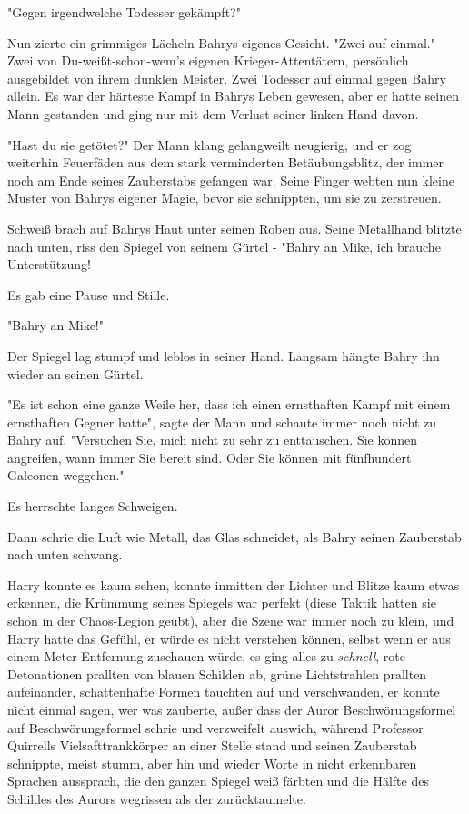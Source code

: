 {"Gegen irgendwelche Todesser gekämpft?"

Nun zierte ein grimmiges Lächeln Bahrys eigenes Gesicht. "Zwei auf einmal." Zwei von Du-weißt-schon-wem's eigenen Krieger-Attentätern, persönlich ausgebildet von ihrem dunklen Meister. Zwei Todesser auf einmal gegen Bahry allein. Es war der härteste Kampf in Bahrys Leben gewesen, aber er hatte seinen Mann gestanden und ging nur mit dem Verlust seiner linken Hand davon.

"Hast du sie getötet?" Der Mann klang gelangweilt neugierig, und er zog weiterhin Feuerfäden aus dem stark verminderten Betäubungsblitz, der immer noch am Ende seines Zauberstabs gefangen war. Seine Finger webten nun kleine Muster von Bahrys eigener Magie, bevor sie schnippten, um sie zu zerstreuen.

Schweiß brach auf Bahrys Haut unter seinen Roben aus. Seine Metallhand blitzte nach unten, riss den Spiegel von seinem Gürtel - "Bahry an Mike, ich brauche Unterstützung!

Es gab eine Pause und Stille.

"Bahry an Mike!"

Der Spiegel lag stumpf und leblos in seiner Hand. Langsam hängte Bahry ihn wieder an seinen Gürtel.

"Es ist schon eine ganze Weile her, dass ich einen ernsthaften Kampf mit einem ernsthaften Gegner hatte", sagte der Mann und schaute immer noch nicht zu Bahry auf. "Versuchen Sie, mich nicht zu sehr zu enttäuschen. Sie können angreifen, wann immer Sie bereit sind. Oder Sie können mit fünfhundert Galeonen weggehen."

Es herrschte langes Schweigen.

Dann schrie die Luft wie Metall, das Glas schneidet, als Bahry seinen Zauberstab nach unten schwang.

Harry konnte es kaum sehen, konnte inmitten der Lichter und Blitze kaum etwas erkennen, die Krümmung seines Spiegels war perfekt (diese Taktik hatten sie schon in der Chaos-Legion geübt), aber die Szene war immer noch zu klein, und Harry hatte das Gefühl, er würde es nicht verstehen können, selbst wenn er aus einem Meter Entfernung zuschauen würde, es ging alles zu \emph{schnell}, rote Detonationen prallten von blauen Schilden ab, grüne Lichtstrahlen prallten aufeinander, schattenhafte Formen tauchten auf und verschwanden, er konnte nicht einmal sagen, wer was zauberte, außer dass der Auror Beschwörungsformel auf Beschwörungsformel schrie und verzweifelt auswich, während Professor Quirrells Vielsafttrankkörper an einer Stelle stand und seinen Zauberstab schnippte, meist stumm, aber hin und wieder Worte in nicht erkennbaren Sprachen aussprach, die den ganzen Spiegel weiß färbten und die Hälfte des Schildes des Aurors wegrissen als der zurücktaumelte.

}
